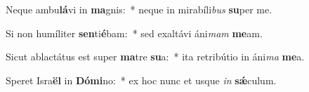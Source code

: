 \item Neque ambu\textbf{lá}vi in \textbf{ma}gnis:~* neque in mirabíli\textit{bus} \textbf{su}per me.
\item Si non humíliter \textbf{sen}ti\textbf{é}bam:~* sed exaltávi áni\textit{mam} \textbf{me}am.
\item Sicut ablactátus est super \textbf{ma}tre \textbf{su}a:~* ita retribútio in áni\textit{ma} \textbf{me}a.
\item Speret Isra\textbf{ël} in \textbf{Dó}\textbf{mi}no:~* ex hoc nunc et usque \textit{in} \textbf{sǽ}culum.
